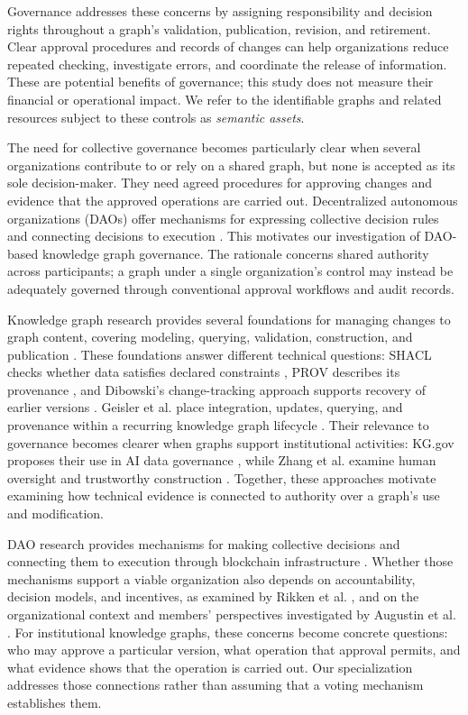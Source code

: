 \documentclass[journal]{IEEEtran}
\begin{document}
Governance addresses these concerns by assigning responsibility
and decision rights throughout a graph's validation, publication,
revision, and retirement. Clear approval procedures and records
of changes can help organizations reduce repeated checking,
investigate errors, and coordinate the release of information.
These are potential benefits of governance; this study does
not measure their financial or operational impact.
We refer to the identifiable graphs and related resources
subject to these controls as \emph{semantic assets}.

The need for collective governance becomes particularly clear
when several organizations contribute to or rely on a shared
graph, but none is accepted as its sole decision-maker.
They need agreed procedures for approving changes and evidence
that the approved operations are carried out. Decentralized
autonomous organizations (DAOs) offer mechanisms for expressing
collective decision rules and connecting decisions to execution
\cite{FaqirRhazoui2020DAOOverview,Hassan2021DAO}.
This motivates our investigation of DAO-based knowledge graph
governance. The rationale concerns shared authority across
participants; a graph under a single organization's control
may instead be adequately governed through conventional
approval workflows and audit records.

Knowledge graph research provides several foundations for managing
changes to graph content, covering modeling, querying, validation,
construction, and publication \cite{Hogan2021KnowledgeGraphs}.
These foundations answer different technical questions: SHACL checks
whether data satisfies declared constraints \cite{Knublauch2017SHACL},
PROV describes its provenance \cite{Moreau2013PROV,Moreau2015Rationale},
and Dibowski's change-tracking approach supports recovery of earlier
versions \cite{Dibowski2024TraceabilityKG}. Geisler et al. place
integration, updates, querying, and provenance within a recurring
knowledge graph lifecycle \cite{Geisler2025KGLifecycle}.
Their relevance to governance becomes clearer when graphs support
institutional activities: KG.gov proposes their use in AI data governance
\cite{MeronoPenuela2025KGgov}, while Zhang et al. examine human oversight
and trustworthy construction \cite{Zhang2025TrustworthyKG}.
Together, these approaches motivate examining how technical evidence
is connected to authority over a graph's use and modification.

DAO research provides mechanisms for making collective decisions and
connecting them to execution through blockchain infrastructure
\cite{FaqirRhazoui2020DAOOverview,Hassan2021DAO}. Whether those
mechanisms support a viable organization also depends on accountability,
decision models, and incentives, as examined by Rikken et al.
\cite{rikken2023governance}, and on the organizational context and
members' perspectives investigated by Augustin et al.
\cite{augustin2023understanding}. For institutional knowledge graphs,
these concerns become concrete questions: who may approve a particular
version, what operation that approval permits, and what evidence shows
that the operation is carried out. Our specialization addresses those
connections rather than assuming that a voting mechanism establishes them.
\end{document}
